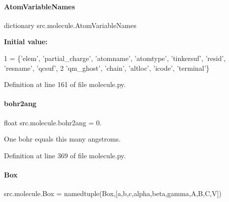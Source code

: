 \mbox{\label{namespacesrc_1_1molecule_a3c3c0e8c5e0c2a020713e1d7beba5269}} 
\paragraph{\texorpdfstring{Atom\+Variable\+Names}{AtomVariableNames}}
{\footnotesize\ttfamily dictionary src.\+molecule.\+Atom\+Variable\+Names}

{\bfseries Initial value\+:}
\begin{DoxyCode}
1 =  \{\textcolor{stringliteral}{'elem'}, \textcolor{stringliteral}{'partial\_charge'}, \textcolor{stringliteral}{'atomname'}, \textcolor{stringliteral}{'atomtype'}, \textcolor{stringliteral}{'tinkersuf'}, \textcolor{stringliteral}{'resid'}, \textcolor{stringliteral}{'resname'}, \textcolor{stringliteral}{'qcsuf'},
2                      \textcolor{stringliteral}{'qm\_ghost'}, \textcolor{stringliteral}{'chain'}, \textcolor{stringliteral}{'altloc'}, \textcolor{stringliteral}{'icode'}, \textcolor{stringliteral}{'terminal'}\}
\end{DoxyCode}


Definition at line 161 of file molecule.\+py.

\mbox{\label{namespacesrc_1_1molecule_a3bec96f13384a74f923dab3a5b499d31}} 
\paragraph{\texorpdfstring{bohr2ang}{bohr2ang}}
{\footnotesize\ttfamily float src.\+molecule.\+bohr2ang = 0.}



One bohr equals this many angstroms. 



Definition at line 369 of file molecule.\+py.

\mbox{\label{namespacesrc_1_1molecule_abfef1f072cfa93bc31e36985a976b65f}} 
\paragraph{\texorpdfstring{Box}{Box}}
{\footnotesize\ttfamily src.\+molecule.\+Box = namedtuple(\textquotesingle{}Box\textquotesingle{},\mbox{[}\textquotesingle{}a\textquotesingle{},\textquotesingle{}b\textquotesingle{},\textquotesingle{}c\textquotesingle{},\textquotesingle{}alpha\textquotesingle{},\textquotesingle{}beta\textquotesingle{},\textquotesingle{}gamma\textquotesingle{},\textquotesingle{}A\textquotesingle{},\textquotesingle{}B\textquotesingle{},\textquotesingle{}C\textquotesingle{},\textquotesingle{}V\textquotesingle{}\mbox{]})}



